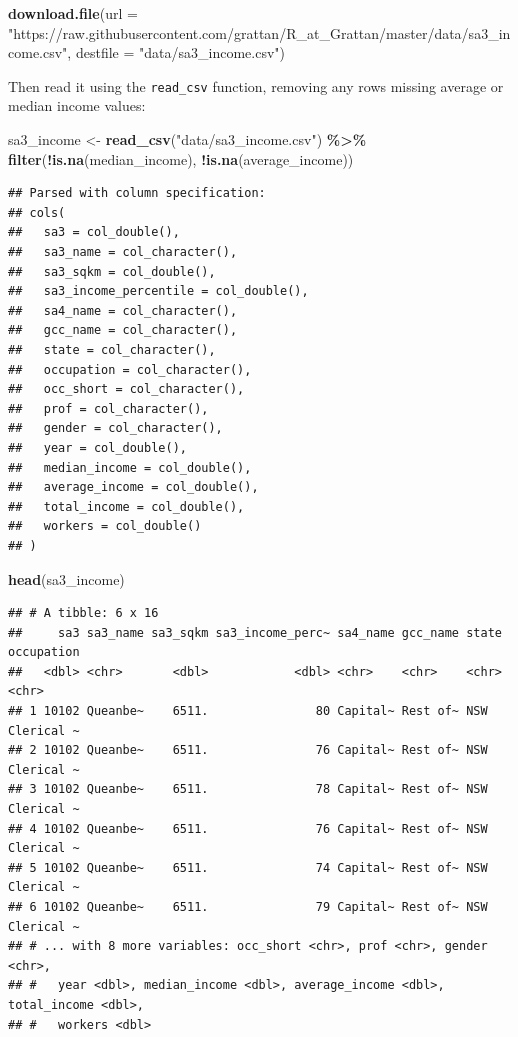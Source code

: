 \documentclass[
]{book}
\newenvironment{Shaded}{\begin{snugshade}}{\end{snugshade}}
\newcommand{\DataTypeTok}[1]{\textcolor[rgb]{0.13,0.29,0.53}{#1}}
\newcommand{\KeywordTok}[1]{\textcolor[rgb]{0.13,0.29,0.53}{\textbf{#1}}}
\newcommand{\NormalTok}[1]{#1}
\newcommand{\OperatorTok}[1]{\textcolor[rgb]{0.81,0.36,0.00}{\textbf{#1}}}
\newcommand{\StringTok}[1]{\textcolor[rgb]{0.31,0.60,0.02}{#1}}
\begin{document}
\begin{Shaded}
\begin{Highlighting}[]
\KeywordTok{download.file}\NormalTok{(}\DataTypeTok{url =} \StringTok{"https://raw.githubusercontent.com/grattan/R\_at\_Grattan/master/data/sa3\_income.csv"}\NormalTok{,}
              \DataTypeTok{destfile =} \StringTok{"data/sa3\_income.csv"}\NormalTok{)}
\end{Highlighting}
\end{Shaded}

Then read it using the \texttt{read\_csv} function, removing any rows missing average or median income values:

\begin{Shaded}
\begin{Highlighting}[]
\NormalTok{sa3\_income \textless{}{-}}\StringTok{ }\KeywordTok{read\_csv}\NormalTok{(}\StringTok{"data/sa3\_income.csv"}\NormalTok{) }\OperatorTok{\%\textgreater{}\%}\StringTok{ }
\StringTok{  }\KeywordTok{filter}\NormalTok{(}\OperatorTok{!}\KeywordTok{is.na}\NormalTok{(median\_income),}
         \OperatorTok{!}\KeywordTok{is.na}\NormalTok{(average\_income))}
\end{Highlighting}
\end{Shaded}

\begin{verbatim}
## Parsed with column specification:
## cols(
##   sa3 = col_double(),
##   sa3_name = col_character(),
##   sa3_sqkm = col_double(),
##   sa3_income_percentile = col_double(),
##   sa4_name = col_character(),
##   gcc_name = col_character(),
##   state = col_character(),
##   occupation = col_character(),
##   occ_short = col_character(),
##   prof = col_character(),
##   gender = col_character(),
##   year = col_double(),
##   median_income = col_double(),
##   average_income = col_double(),
##   total_income = col_double(),
##   workers = col_double()
## )
\end{verbatim}

\begin{Shaded}
\begin{Highlighting}[]
\KeywordTok{head}\NormalTok{(sa3\_income)}
\end{Highlighting}
\end{Shaded}

\begin{verbatim}
## # A tibble: 6 x 16
##     sa3 sa3_name sa3_sqkm sa3_income_perc~ sa4_name gcc_name state occupation
##   <dbl> <chr>       <dbl>            <dbl> <chr>    <chr>    <chr> <chr>     
## 1 10102 Queanbe~    6511.               80 Capital~ Rest of~ NSW   Clerical ~
## 2 10102 Queanbe~    6511.               76 Capital~ Rest of~ NSW   Clerical ~
## 3 10102 Queanbe~    6511.               78 Capital~ Rest of~ NSW   Clerical ~
## 4 10102 Queanbe~    6511.               76 Capital~ Rest of~ NSW   Clerical ~
## 5 10102 Queanbe~    6511.               74 Capital~ Rest of~ NSW   Clerical ~
## 6 10102 Queanbe~    6511.               79 Capital~ Rest of~ NSW   Clerical ~
## # ... with 8 more variables: occ_short <chr>, prof <chr>, gender <chr>,
## #   year <dbl>, median_income <dbl>, average_income <dbl>, total_income <dbl>,
## #   workers <dbl>
\end{verbatim}
\end{document}
